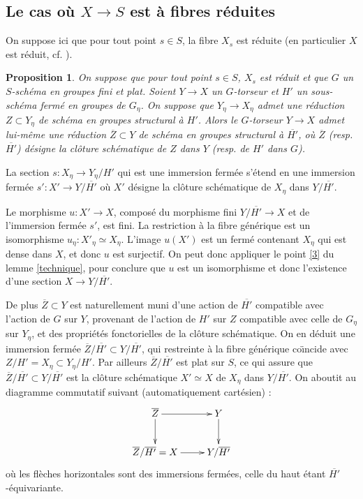 \documentclass[11pt]{amsart}
\numberwithin{equation}{section}
\newtheorem{prop}[thm]{Proposition}
\theoremstyle{definition}
\theoremstyle{remark}
\begin{document}
\subsection{Le cas o\`u $X \to S$ est \`a fibres r\'eduites }\label{Reduit} On suppose ici que pour tout point $s\in S$, la fibre $X_s$ est r\'eduite (en particulier $X$ est r\'eduit, cf. \cite[prop. 9.5.9]{EGAI}).



\begin{prop}\label{lem22}
On suppose que pour tout point $s\in S$,  $X_s$ est r\'eduit et que $G$ un $S$-sch\'ema en groupes fini et plat. Soient $Y\to X$ un $G$-torseur et $H'$ un sous-sch\'ema ferm\'e en groupes de $G_{\eta}$. On suppose que $Y_{\eta}\to X_{\eta}$ admet une r\'eduction $Z\subset Y_\eta$ de sch\'ema en groupes structural \`a $H'$. Alors le $G$-torseur $Y \to X$ admet lui-m\^eme une r\'eduction $\overline Z \subset Y$ de sch\'ema en groupes structural \`a $\overline {H'}$, o\`u $\overline Z$ (resp. $\overline {H'}$) d\'esigne la cl\^oture sch\'ematique de $Z$ dans $Y$ (resp. de $H'$ dans $G$).

\end{prop}



\proof
La section $s : X_\eta \to Y_\eta /H'$ qui est une immersion ferm\'ee s'\'etend en une immersion ferm\'ee $s' :X' \to Y/\overline {H'}$ o\`u $X'$ d\'esigne la cl\^oture sch\'ematique de $X_\eta $ dans $Y / \overline {H'}$.

Le morphisme $u: X' \to X$, compos\'e du morphisme fini $Y/\overline {H'} \to X$ et de l'immersion ferm\'ee $s'$, est fini. La restriction \`a la fibre g\'en\'erique est un isomorphisme $u_\eta : X'_\eta \simeq X_\eta$. L'image $u(X')$ est un ferm\'e contenant $X_\eta $ qui est dense dans $X$, et donc $u$ est surjectif.
 On peut donc appliquer le point \ref{3} du lemme \ref{technique}, pour conclure que $u$ est un isomorphisme et donc l'existence d'une section $X \to Y/\overline {H'}$.

 De plus $\overline Z \subset Y$ est naturellement muni d'une action de $\overline {H'} $ compatible avec l'action de $G$ sur $Y$, provenant de l'action de $H'$ sur $Z$ compatible avec celle de $G_\eta $ sur $Y_\eta$, et des propri\'et\'es fonctorielles de la cl\^oture sch\'ematique. On en d\'eduit une immersion ferm\'ee $\overline Z /\overline {H'} \subset Y/\overline {H'}$, qui restreinte \`a la fibre g\'en\'erique co\" \i ncide avec $Z/H' =X_\eta \subset Y_\eta /H'$. Par ailleurs $\overline Z/ \overline {H'}$ est plat sur $S$, ce qui assure que $\overline Z/ \overline {H'} \subset Y/ \overline {H'}$ est la cl\^oture sch\'ematique $X' \simeq X$ de $X_\eta $ dans $Y/ \overline {H'}$. On aboutit au diagramme commutatif suivant (automatiquement cart\'esien) :
 $$\xymatrix{
 \overline Z \ar[r]\ar[d] &Y \ar[d] \\
 \overline Z /\overline {H'} =X \ar[r]& Y /\overline {H'}\\
 }$$
 o\`u les fl\`eches horizontales sont des immersions ferm\'ees, celle du haut \'etant $\overline {H'}$-\'equivariante. \endproof
\end{document}
